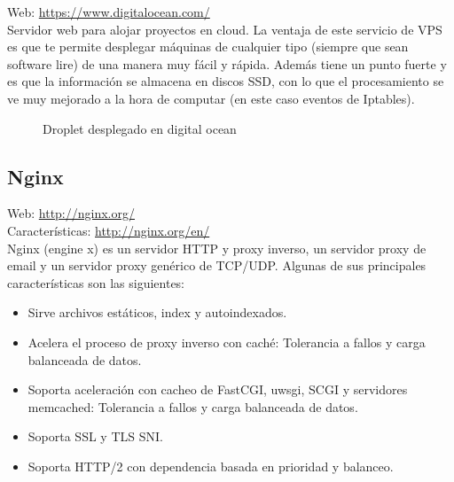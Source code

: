 Web: \url{https://www.digitalocean.com/}\\

Servidor web para alojar proyectos en cloud. La ventaja de este servicio de VPS es que te permite desplegar máquinas de cualquier tipo (siempre que sean software lire) de una manera muy fácil y rápida. Además tiene un punto fuerte y es que la información se almacena en discos SSD, con lo que el procesamiento se ve muy mejorado a la hora de computar (en este caso eventos de Iptables).\\

\begin{figure}[H]
\caption{Droplet desplegado en digital ocean}
\end{figure}

\subsection{Nginx}


Web: \url{http://nginx.org/}\\
Características: \url{http://nginx.org/en/}\\

Nginx (engine x) es un servidor HTTP y proxy inverso, un servidor proxy de email y un servidor proxy genérico de TCP/UDP. Algunas de sus principales características son las siguientes:\\

\begin{itemize}
\item Sirve archivos estáticos, index y autoindexados.
\item Acelera el proceso de proxy inverso con caché: Tolerancia a fallos y carga balanceada de datos.
\item Soporta aceleración con cacheo de FastCGI, uwsgi, SCGI y servidores memcached: Tolerancia a fallos y carga balanceada de datos.
\item Soporta SSL y TLS SNI.
\item Soporta HTTP/2 con dependencia basada en prioridad y balanceo.
\end{itemize}

